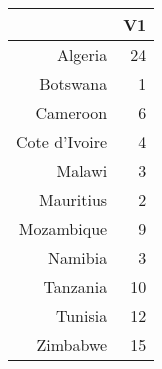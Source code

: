 \begin{table}[ht]
\centering
\begin{tabular}{rr}
  \hline
 & V1 \\ 
  \hline
Algeria &  24 \\ 
  Botswana &   1 \\ 
  Cameroon &   6 \\ 
  Cote d'Ivoire &   4 \\ 
  Malawi &   3 \\ 
  Mauritius &   2 \\ 
  Mozambique &   9 \\ 
  Namibia &   3 \\ 
  Tanzania &  10 \\ 
  Tunisia &  12 \\ 
  Zimbabwe &  15 \\ 
   \hline
\end{tabular}
\end{table}
